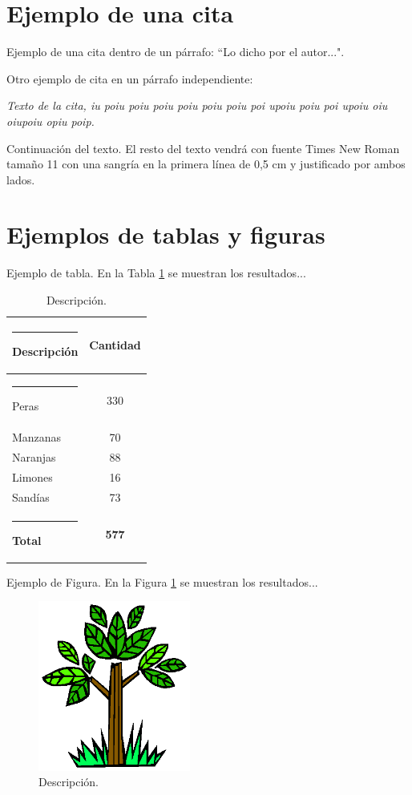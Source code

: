 \documentclass[a4paper,11pt,twocolumn,twoside]{article}
\begin{document}
\section{Ejemplo de una cita}

Ejemplo de una cita dentro de un párrafo: ``Lo dicho por el
autor...".

Otro ejemplo de cita en un párrafo independiente:

\parbox{6.5cm}{\textit{Texto de la cita, iu poiu poiu poiu poiu poiu poiu poi
upoiu poiu poi upoiu oiu oiupoiu opiu poip.}}

Continuación del texto. El resto del texto vendrá con fuente
Times New Roman tamaño 11 con una sangría en la primera línea de
0,5 cm y justificado por ambos lados.


\section{Ejemplos de tablas y figuras}

Ejemplo de tabla. En la Tabla \ref{tabla1} se muestran los
resultados...
\begin{table} [h]
\begin{center}
\begin{tabular} {|l|c|}
  \hline\rule{-2pt}{15pt}
  {\bf Descripción} & {\bf Cantidad}\\
  \hline\rule{-4pt}{10pt}
  Peras & 330\\
  Manzanas & 70\\
  Naranjas &  88\\
  Limones & 16\\
  Sandías & 73\\
  \hline\rule{-2pt}{10pt}
  {\bf Total}  & {\bf 577}\\
  \hline
\end{tabular}
\end{center}
\caption{\label{tabla1}Descripción.}
\end{table}

Ejemplo de Figura. En la Figura \ref{figura1} se muestran los
resultados...

\begin{figure}[h]
  \centering
  \includegraphics[width=5cm,clip]{ejem1.eps}
  \caption{Descripción.}
  \label{figura1}
\end{figure}
\end{document}
